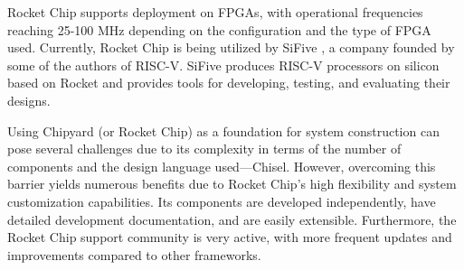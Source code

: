 Rocket Chip supports deployment on FPGAs, with operational frequencies reaching 25-100 MHz depending on the configuration and the type of FPGA used. Currently, Rocket Chip is being utilized by SiFive \cite{sifive2024portfolio}, a company founded by some of the authors of RISC-V. SiFive produces RISC-V processors on silicon based on Rocket and provides tools for developing, testing, and evaluating their designs.

Using Chipyard (or Rocket Chip) as a foundation for system construction can pose several challenges due to its complexity in terms of the number of components and the design language used—Chisel. However, overcoming this barrier yields numerous benefits due to Rocket Chip's high flexibility and system customization capabilities. Its components are developed independently, have detailed development documentation, and are easily extensible. Furthermore, the Rocket Chip support community is very active, with more frequent updates and improvements compared to other frameworks.
